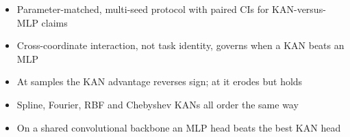 \begin{itemize}
\item Parameter-matched, multi-seed protocol with paired CIs for KAN-versus-MLP claims
\item Cross-coordinate interaction, not task identity, governs when a KAN beats an MLP
\item At  samples the KAN advantage reverses sign; at  it erodes but holds
\item Spline, Fourier, RBF and Chebyshev KANs all order the same way
\item On a shared convolutional backbone an MLP head beats the best KAN head
\end{itemize}
